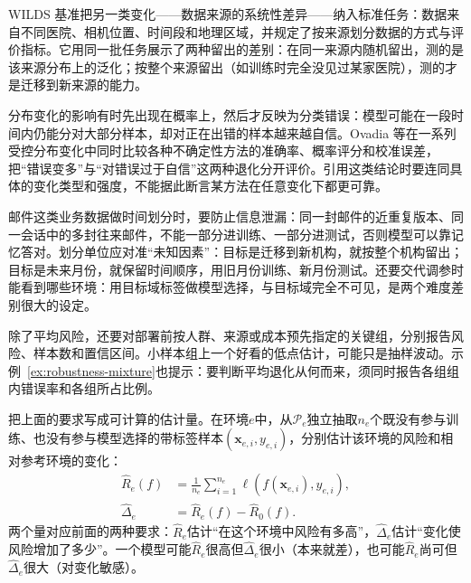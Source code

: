 WILDS 基准把另一类变化——数据来源的系统性差异——纳入标准任务：数据来自不同医院、相机位置、时间段和地理区域，并规定了按来源划分数据的方式与评价指标。它用同一批任务展示了两种留出的差别：在同一来源内随机留出，测的是该来源分布上的泛化；按整个来源留出（如训练时完全没见过某家医院），测的才是迁移到新来源的能力。

\Needspace{45mm}
分布变化的影响有时先出现在概率上，然后才反映为分类错误：模型可能在一段时间内仍能分对大部分样本，却对正在出错的样本越来越自信。Ovadia 等在一系列受控分布变化中同时比较各种不确定性方法的准确率、概率评分和校准误差，把“错误变多”与“对错误过于自信”这两种退化分开评价。引用这类结论时要连同具体的变化类型和强度，不能据此断言某方法在任意变化下都更可靠。

邮件这类业务数据做时间划分时，要防止信息泄漏：同一封邮件的近重复版本、同一会话中的多封往来邮件，不能一部分进训练、一部分进测试，否则模型可以靠记忆答对。划分单位应对准“未知因素”：目标是迁移到新机构，就按整个机构留出；目标是未来月份，就保留时间顺序，用旧月份训练、新月份测试。还要交代调参时能看到哪些环境：用目标域标签做模型选择，与目标域完全不可见，是两个难度差别很大的设定。

除了平均风险，还要对部署前按人群、来源或成本预先指定的关键组，分别报告风险、样本数和置信区间。小样本组上一个好看的低点估计，可能只是抽样波动。示例~\ref{ex:robustness-mixture}也提示：要判断平均退化从何而来，须同时报告各组组内错误率和各组所占比例。

把上面的要求写成可计算的估计量。在环境$e$中，从$\mathcal P_e$独立抽取$n_e$个既没有参与训练、也没有参与模型选择的带标签样本$(\bm{x}_{e,i},y_{e,i})$，分别估计该环境的风险和相对参考环境的变化：
\begin{equation}
 \begin{aligned}
 \widehat R_e(f)&=\frac{1}{n_e}\sum_{i=1}^{n_e}
       \ell(f(\bm{x}_{e,i}),y_{e,i}),\\
 \widehat\Delta_e&=\widehat R_e(f)-\widehat R_0(f).
 \end{aligned}
 \label{eq:robustness-environment-test}
\end{equation}
两个量对应前面的两种要求：$\widehat R_e$估计“在这个环境中风险有多高”，$\widehat\Delta_e$估计“变化使风险增加了多少”。一个模型可能$\widehat R_e$很高但$\widehat\Delta_e$很小（本来就差），也可能$\widehat R_e$尚可但$\widehat\Delta_e$很大（对变化敏感）。

